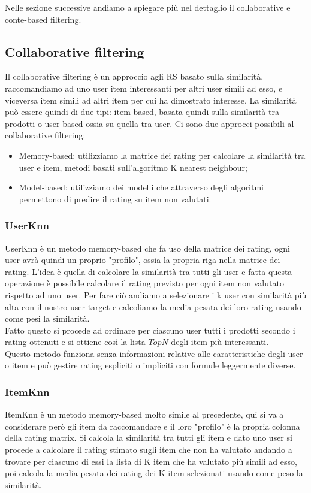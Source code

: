 Nelle sezione successive andiamo a spiegare più nel dettaglio il collaborative e conte-based filtering.

\subsection{Collaborative filtering}
Il collaborative filtering è un approccio agli RS basato sulla similarità, raccomandiamo ad uno user item interessanti per altri user simili ad esso, e viceversa item simili ad altri item per cui ha dimostrato interesse.
La similarità può essere quindi di due tipi: item-based, basata quindi sulla similarità tra prodotti o user-based ossia su quella tra user.
Ci sono due approcci possibili al collaborative filtering:
\begin{itemize}
	\item Memory-based: utilizziamo la matrice dei rating per calcolare la similarità tra user e item, metodi basati sull'algoritmo K nearest neighbour;
	\item Model-based: utilizziamo dei modelli che attraverso degli algoritmi permettono di predire il rating su item non valutati.
\end{itemize}

\subsubsection{UserKnn}
UserKnn è un metodo memory-based che fa uso della matrice dei rating, ogni user avrà quindi un proprio "profilo", ossia la propria riga nella matrice dei rating. L'idea è quella di calcolare la similarità tra tutti gli user e fatta questa operazione è possibile calcolare il rating previsto per ogni item non valutato rispetto ad uno user.
Per fare ciò andiamo a selezionare i k user con similarità più alta con il nostro user target e calcoliamo la media pesata dei loro rating usando come pesi la similarità.\\
Fatto questo si procede ad ordinare per ciascuno user tutti i prodotti secondo i rating ottenuti e si ottiene così la lista $TopN$ degli item più interessanti.\\
Questo metodo funziona senza informazioni relative alle caratteristiche degli user o item e può gestire rating espliciti o impliciti con formule leggermente diverse.

\subsubsection{ItemKnn}
ItemKnn è un metodo memory-based molto simile al precedente, qui si va a considerare però gli item da raccomandare e il loro "profilo" è la propria colonna della rating matrix. Si calcola la similarità tra tutti gli item e dato uno user si procede a calcolare il rating stimato sugli item che non ha valutato andando a trovare per ciascuno di essi la lista di K item che ha valutato più simili ad esso, poi calcola la media pesata dei rating dei K item selezionati usando come peso la similarità. 
 
